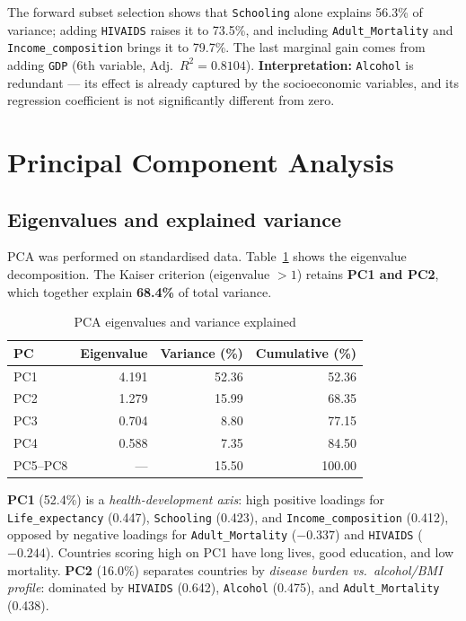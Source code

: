 \documentclass[11pt, a4paper]{article}
\begin{document}
The forward subset selection shows that \texttt{Schooling} alone explains 56.3\%
of variance; adding \texttt{HIVAIDS} raises it to 73.5\%, and including
\texttt{Adult\_Mortality} and \texttt{Income\_composition} brings it to 79.7\%.
The last marginal gain comes from adding \texttt{GDP} (6th variable, Adj.\ $R^2 = 0.8104$).
\textbf{Interpretation:} \texttt{Alcohol} is redundant — its effect is already captured by the
socioeconomic variables, and its regression coefficient is not significantly different from zero.

\section{Principal Component Analysis}

\subsection{Eigenvalues and explained variance}

PCA was performed on standardised data. Table~\ref{tab:pca} shows the eigenvalue
decomposition. The Kaiser criterion (eigenvalue $> 1$) retains \textbf{PC1 and PC2},
which together explain \textbf{68.4\%} of total variance.

\begin{table}[H]
\centering
\caption{PCA eigenvalues and variance explained}
\label{tab:pca}
\small
\begin{tabular}{lrrr}
\toprule
\textbf{PC} & \textbf{Eigenvalue} & \textbf{Variance (\%)} & \textbf{Cumulative (\%)}\\
\midrule
PC1 & 4.191 & 52.36 & 52.36\\
PC2 & 1.279 & 15.99 & 68.35\\
PC3 & 0.704 & 8.80 & 77.15\\
PC4 & 0.588 & 7.35 & 84.50\\
PC5–PC8 & — & 15.50 & 100.00\\
\bottomrule
\end{tabular}
\end{table}

\textbf{PC1} (52.4\%) is a \emph{health-development axis}: high positive loadings for
\texttt{Life\_expectancy} (0.447), \texttt{Schooling} (0.423), and
\texttt{Income\_composition} (0.412), opposed by negative loadings for
\texttt{Adult\_Mortality} ($-0.337$) and \texttt{HIVAIDS} ($-0.244$).
Countries scoring high on PC1 have long lives, good education, and low mortality.
\textbf{PC2} (16.0\%) separates countries by \emph{disease burden vs.\ alcohol/BMI
profile}: dominated by \texttt{HIVAIDS} (0.642), \texttt{Alcohol} (0.475), and
\texttt{Adult\_Mortality} (0.438).
\end{document}

